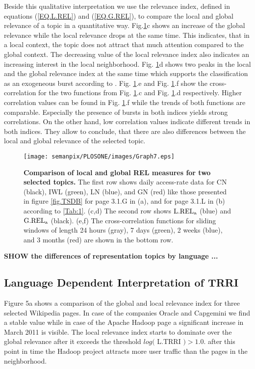 \documentclass[a4paper,10pt]{scrbook}
\begin{document}
Beside this qualitative interpretation we use the relevance index, defined in
equations (\ref{EQ.L.REL}) and (\ref{EQ.G.REL}), to compare the local and global relevance of a topic in
a quantitative way. Fig.\ref{fig.TRI}c shows an increase of the global relevance
while the local relevance drops at the same time. This indicates, that in a
local context, the topic does not attract that much attention compared to the
global context. The decreasing value of the local relevance index also
indicates an increasing interest in the local neighborhood. Fig. \ref{fig.TRI}d
shows two peaks in the local and the global relevance index at the same time
which supports the classification as an exogeneous burst according to
\cite{Sornette.2008}.
Fig. \ref{fig.TRI}.e and Fig. \ref{fig.TRI}.f show the cross-correlation for the
two functions from Fig. \ref{fig.TRI}.c and Fig. \ref{fig.TRI}.d respectively.
Higher correlation values can be found in Fig. \ref{fig.TRI}.f while the trends of both functions are
comparable. Especially the presence of bursts in both indices yields strong correlations. On the other hand, low correlation values indicate different trends in both indices. They allow to conclude,
that there are also differences between the local and global relevance of the
selected topic.


\begin{figure}[!ht]
\begin{center}
\texttt{[image: semanpix/PLOSONE/images/Graph7.eps]}
\end{center}
\caption{
{\bf Comparison of local and global REL measures for two selected topics.}
The first row shows daily access-rate data for CN (black), IWL (green), LN
(blue), and GN (red) like those presented in figure \ref{fig.TSDB} for
page 3.1.G in (a), and for page 3.1.L in (b) according to \ref{Tab:1}. (c,d) The second row
shows $\rm L.REL_a$ (blue) and $\rm G.REL_a$ (black). (e,f) The cross-correlation functions for 
sliding windows of length 24 hours (gray), 7 days (green), 2 weeks (blue), and 3
months (red) are shown in the bottom row.}
\label{fig.TRI}
\end{figure}

\textbf{SHOW the differences of representation topics by language ...}

\subsection*{Language Dependent Interpretation of TRRI}
Figure 5a shows a comparison of the global and local relevance index for three selected Wikipedia pages. In case of the companies Oracle and Capgemini we find a stable value while in case of the Apache Hadoop page a significant increase in March 2011 is visible. The local relevance index starts to dominate over the global relevance after it exceeds the threshold $log($ L.TRRI $) > 1.0$. after this point in time the Hadoop project attracts more user traffic than the pages in the neighborhood. 
 
\end{document}
